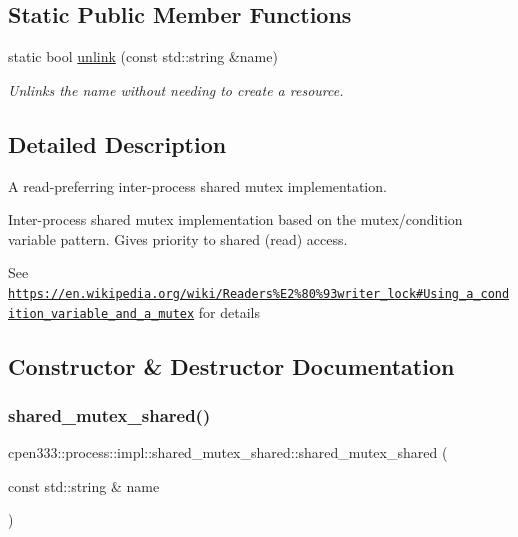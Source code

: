 \subsection*{Static Public Member Functions}
\begin{DoxyCompactItemize}
\item 
static bool \hyperlink{classcpen333_1_1process_1_1impl_1_1shared__mutex__shared_a855882d87dd04246229b624179837030}{unlink} (const std\+::string \&name)
\begin{DoxyCompactList}\small\item\em Unlinks the name without needing to create a resource. \end{DoxyCompactList}\end{DoxyCompactItemize}


\subsection{Detailed Description}
A read-\/preferring inter-\/process shared mutex implementation. 

Inter-\/process shared mutex implementation based on the mutex/condition variable pattern. Gives priority to shared (read) access.

See \href{https://en.wikipedia.org/wiki/Readers%E2%80%93writer_lock#Using_a_condition_variable_and_a_mutex}{\tt https\+://en.\+wikipedia.\+org/wiki/\+Readers\%\+E2\%80\%93writer\+\_\+lock\#\+Using\+\_\+a\+\_\+condition\+\_\+variable\+\_\+and\+\_\+a\+\_\+mutex} for details 

\subsection{Constructor \& Destructor Documentation}
\mbox{\label{classcpen333_1_1process_1_1impl_1_1shared__mutex__shared_aa94fee843eb846e57c4ac51589172849}} 
\subsubsection{\texorpdfstring{shared\+\_\+mutex\+\_\+shared()}{shared\_mutex\_shared()}}
{\footnotesize\ttfamily cpen333\+::process\+::impl\+::shared\+\_\+mutex\+\_\+shared\+::shared\+\_\+mutex\+\_\+shared (\begin{DoxyParamCaption}\item[{const std\+::string \&}]{name }\end{DoxyParamCaption})\hspace{0.3cm}{\ttfamily [inline]}}

